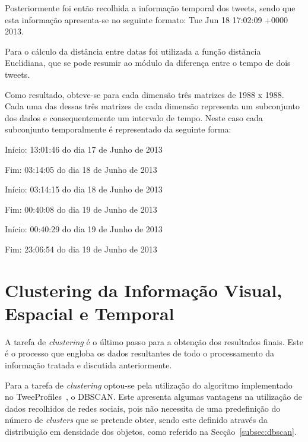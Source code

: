 Posteriormente foi então recolhida a informação temporal dos tweets, sendo que esta informação apresenta-se no seguinte formato: Tue Jun 18 17:02:09 +0000 2013. 

Para o cálculo da distância entre datas foi utilizada a função distância Euclidiana, que se pode resumir ao módulo da diferença entre o tempo de dois tweets.

Como resultado, obteve-se para cada dimensão três matrizes de 1988 x 1988. Cada uma das dessas três matrizes de cada dimensão representa um subconjunto dos dados e consequentemente um intervalo de tempo. Neste caso cada subconjunto temporalmente é representado da seguinte forma:

\begin{description}
\item[Subconjunto 1]
\item Início: 13:01:46 do dia 17 de Junho de 2013 
\item Fim: 03:14:05 do dia 18 de Junho de 2013

\item[Subconjunto 2]
\item Início: 03:14:15 do dia 18 de Junho de 2013 
\item Fim: 00:40:08 do dia 19 de Junho de 2013

\item[Subconjunto 3]
\item Início: 00:40:29 do dia 19 de Junho de 2013 
\item Fim: 23:06:54 do dia 19 de Junho de 2013
\end{description}


\section{Clustering da Informação Visual, Espacial e Temporal} \label{sec:finalclustering}

A tarefa de \textit{clustering} é o último passo para a obtenção dos resultados finais. Este é o processo que engloba os dados resultantes de todo o processamento da informação tratada e discutida anteriormente.

Para a tarefa de \textit{clustering} optou-se pela utilização do algoritmo implementado no TweeProfiles~\cite{Cunha2013}, o DBSCAN. Este apresenta algumas vantagens na utilização de dados recolhidos de redes sociais, pois não necessita de uma predefinição do número de \textit{clusters} que se pretende obter, sendo este definido através da distribuição em densidade dos objetos, como referido na Secção~\ref{subsec:dbscan}.


